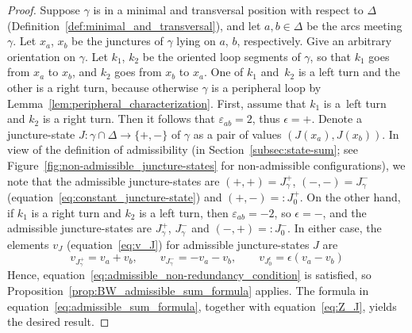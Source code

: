 \documentclass[pdftex]{sigma}
\numberwithin{equation}{section}
\theoremstyle{definition}
\begin{document}
\begin{proof} Suppose $\gamma$ is in a minimal and transversal position with respect to $\Delta$ (Definition~\ref{def:minimal_and_transversal}), and let $a,b\in \Delta$ be the arcs meeting $\gamma$. Let $x_a$, $x_b$ be the junctures of $\gamma$ lying on $a$, $b$, respectively. Give an arbitrary orientation on $\gamma$. Let $k_1$, $k_2$ be the oriented loop segments of $\gamma$, so that $k_1$ goes from $x_a$ to $x_b$, and $k_2$ goes from $x_b$ to $x_a$. One of $k_1$ and~$k_2$ is a left turn and the other is a right turn, because otherwise $\gamma$ is a peripheral loop by Lemma~\ref{lem:peripheral_characterization}. First, assume that $k_1$ is a~left turn and $k_2$ is a right turn. Then it follows that $\varepsilon_{ab} = 2$, thus $\epsilon=+$. Denote a juncture-state $J \colon \gamma \cap \Delta \to \{+,-\}$ of $\gamma$ as a pair of values $(J(x_a),J(x_b))$. In view of the definition of admissibility (in Section~\ref{subsec:state-sum}; see Figure~\ref{fig:non-admissible_juncture-states} for non-admissible configurations), we note that the admissible juncture-states are $(+,+) = J_{\gamma}^+$, $(-,-) = J_{\gamma}^-$ (equation~\eqref{eq:constant_juncture-state}) and $(+,-) =: J_0^+$. On the other hand, if $k_1$ is a right turn and $k_2$ is a left turn, then $\varepsilon_{ab} = -2$, so $\epsilon=-$, and the admissible juncture-states are $J_\gamma^+$, $J_\gamma^-$ and $(-,+) =: J_0^-$. In either case, the elements $v_J$ (equation~\eqref{eq:v_J}) for admissible juncture-states $J$ are
\[
v_{J_\gamma^+} = v_a + v_b, \qquad v_{J_\gamma^-} = -v_a - v_b, \qquad
v_{J_0^\epsilon} = \epsilon(v_a - v_b)
\]
Hence, equation~\eqref{eq:admissible_non-redundancy_condition} is satisfied, so Proposition~\ref{prop:BW_admissible_sum_formula} applies. The formula in equation~\eqref{eq:admissible_sum_formula}, together with equation~\eqref{eq:Z_J}, yields the desired result.
\end{proof}
\end{document}
